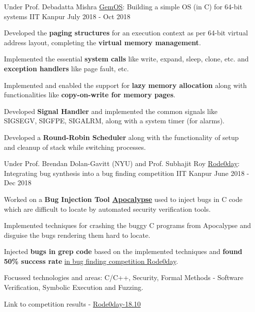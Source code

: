 \begin{cventries}
  \cventry
    {Under Prof. Debadatta Mishra} %
    {\href{https://dl.acm.org/doi/10.1145/3338698.3338887}{GemOS}: Building a simple OS (in C) for 64-bit systems} %
    {IIT Kanpur} %
    {July 2018 - Oct 2018} %
    {
      \begin{cvitems} %
      \item {Developed the \textbf{paging structures} for an execution context as per 64-bit virtual address layout, completing the \textbf{virtual memory management}.}
      \item {Implemented the essential \textbf{system calls} like write, expand, sleep, clone, etc. and \textbf{exception handlers} like page fault, etc.}
      \item {Implemented and enabled the support for \textbf{lazy memory allocation} along with functionalities like \textbf{copy-on-write for memory pages}.}
      \item {Developed \textbf{Signal Handler} and implemented the common signals like SIGSEGV, SIGFPE, SIGALRM, along with a system timer (for alarms).}
      \item {Developed a \textbf{Round-Robin Scheduler} along with the functionality of setup and cleanup of stack while switching processes.}
      \end{cvitems}
    }



  \cventry
    {Under Prof. Brendan Dolan-Gavitt (NYU) and Prof. Subhajit Roy} %
    {\href{https://rode0day.mit.edu/}{Rode0day}: Integrating bug synthesis into a bug finding competition} %
    {IIT Kanpur} %
    {June 2018 - Dec 2018} %
    {
      \begin{cvitems} %
        \item {Worked on a \textbf{Bug Injection Tool \href{https://dl.acm.org/doi/abs/10.1145/3236024.3236084}{Apocalypse}} used to inject bugs in C code which are difficult to locate by automated security verification tools.}
        \item {Implemented techniques for crashing the buggy C programs from Apocalypse and disguise the bugs rendering them hard to locate.}
        \item {Injected \textbf{bugs in grep code} based on the implemented techniques and \textbf{found 50\% success rate} \href{https://rode0day.mit.edu/results/4}{in bug finding competition Rode0day}.}
        \item {Focussed technologies and areas: C/C++, Security, Formal Methods - Software Verification, Symbolic Execution and Fuzzing.}
        \item {Link to competition results - \href{https://rode0day.mit.edu/results/4}{Rode0day-18.10}}
      \end{cvitems}
    }


\end{cventries}
